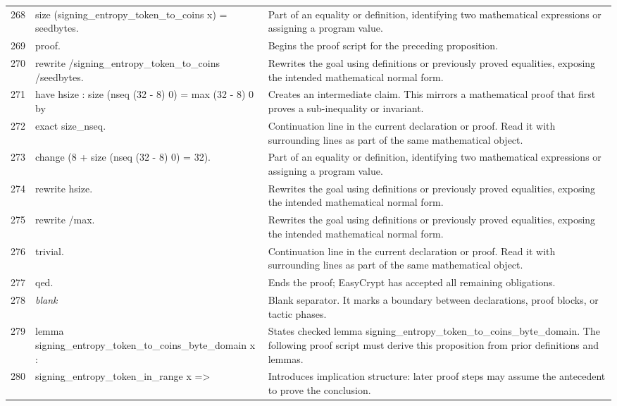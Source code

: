\documentclass[10pt]{article}
\begin{document}
\begin{longtable}{r L{0.53\textwidth} L{0.37\textwidth}}
268 & {\ttfamily\scriptsize   size (signing\_entropy\_token\_to\_coins x) = seedbytes.} & Part of an equality or definition, identifying two mathematical expressions or assigning a program value. \\
269 & {\ttfamily\scriptsize proof.} & Begins the proof script for the preceding proposition. \\
270 & {\ttfamily\scriptsize rewrite /signing\_entropy\_token\_to\_coins /seedbytes.} & Rewrites the goal using definitions or previously proved equalities, exposing the intended mathematical normal form. \\
271 & {\ttfamily\scriptsize have hsize : size (nseq (32 - 8) 0) = max (32 - 8) 0 by} & Creates an intermediate claim.  This mirrors a mathematical proof that first proves a sub-inequality or invariant. \\
272 & {\ttfamily\scriptsize   exact size\_nseq.} & Continuation line in the current declaration or proof.  Read it with surrounding lines as part of the same mathematical object. \\
273 & {\ttfamily\scriptsize change (8 + size (nseq (32 - 8) 0) = 32).} & Part of an equality or definition, identifying two mathematical expressions or assigning a program value. \\
274 & {\ttfamily\scriptsize rewrite hsize.} & Rewrites the goal using definitions or previously proved equalities, exposing the intended mathematical normal form. \\
275 & {\ttfamily\scriptsize rewrite /max.} & Rewrites the goal using definitions or previously proved equalities, exposing the intended mathematical normal form. \\
276 & {\ttfamily\scriptsize trivial.} & Continuation line in the current declaration or proof.  Read it with surrounding lines as part of the same mathematical object. \\
277 & {\ttfamily\scriptsize qed.} & Ends the proof; EasyCrypt has accepted all remaining obligations. \\
278 & {\ttfamily\scriptsize \emph{blank}} & Blank separator.  It marks a boundary between declarations, proof blocks, or tactic phases. \\
279 & {\ttfamily\scriptsize lemma signing\_entropy\_token\_to\_coins\_byte\_domain x :} & States checked lemma signing\_entropy\_token\_to\_coins\_byte\_domain.  The following proof script must derive this proposition from prior definitions and lemmas. \\
280 & {\ttfamily\scriptsize   signing\_entropy\_token\_in\_range x =>} & Introduces implication structure: later proof steps may assume the antecedent to prove the conclusion. \\

\end{longtable}
\end{document}
